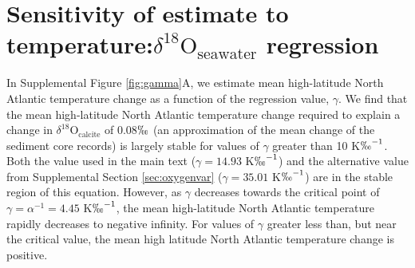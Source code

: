 \documentclass[draft]{agujournal2019}
\begin{document}
\section{Sensitivity of estimate to temperature:$\delta^{18}\mathrm{O}_{\mathrm{seawater}}$ regression \label{sec:gammasens}}
In Supplemental Figure \ref{fig:gamma}A, we estimate mean high-latitude North Atlantic temperature change as a function of the regression value, $\gamma$. We find that the mean high-latitude North Atlantic temperature change required to explain a change in $\delta^{18}\mathrm{O}_{\mathrm{calcite}}$ of 0.08$\permil$ (an approximation of the mean change of the sediment core records) is largely stable for values of $\gamma$ greater than 10 K$\permil^{-1}$. Both the value used in the main text ($\gamma = 14.93$ K$\permil^{-1}$) and the alternative value from Supplemental Section \ref{sec:oxygenvar} ($\gamma = 35.01$ K$\permil^{-1}$) are in the stable region of this equation. However, as $\gamma$ decreases towards the critical point of $\gamma = \alpha^{-1} = 4.45 $ K$\permil^{-1}$, the mean high-latitude North Atlantic temperature rapidly decreases to negative infinity. For values of $\gamma$ greater less than, but near the critical value, the mean high latitude North Atlantic temperature change is positive. 
\end{document}
